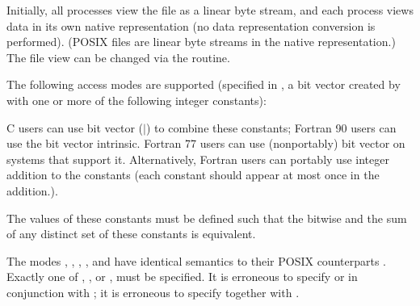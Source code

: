 Initially, all processes view the file as a linear byte stream,
and each process views data in its own native representation
(no data representation conversion is performed).
(POSIX files are linear byte streams in the native representation.)
The file view can be changed
via the  routine.

The following access modes are supported
(specified in , a bit vector created by  with one or more of the following
integer constants):
\begin{constlist}
\end{constlist}

\begin{users}
C users can use bit vector  ($\mid$) to combine these constants;
Fortran 90 users can use the bit vector  intrinsic.
Fortran 77 users can use (nonportably) bit vector 
on systems that support it.
Alternatively,
Fortran users can portably use integer addition to  the constants
(each constant should appear at most once in the addition.).
\end{users}

\begin{implementors}
The values of these constants must be defined such that
the bitwise  and the sum of any distinct set
of these constants is equivalent.
\end{implementors}

The modes , , 
,
, and  have identical semantics
to their POSIX counterparts \cite{posix-1003.1}.
Exactly one of , , 
or ,
must be specified.
It is erroneous to specify  
or 
in conjunction with ;
it is erroneous to specify 
together with .


